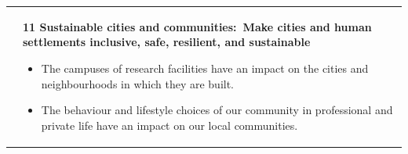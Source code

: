 \documentclass[../SustainableHEP.tex]{subfiles}
\begin{document}
\begin{longtable*}{l l}
\parbox[t]{\SDGleft\textwidth}{} & \parbox[t]{\SDGright\textwidth}{\textbf{11 Sustainable cities and communities:\ Make cities and human settlements inclusive, safe, resilient, and sustainable}
\vspace{\recskip}
\begin{itemize}[leftmargin=20pt]
\setlength{\itemsep}{\recskip}
\item The campuses of research facilities have an impact on the cities and neighbourhoods in which they are built.
\item The behaviour and lifestyle choices of our community in professional and private life have an impact on our local communities.
\end{itemize}}\\


\end{longtable*}
\end{document}
